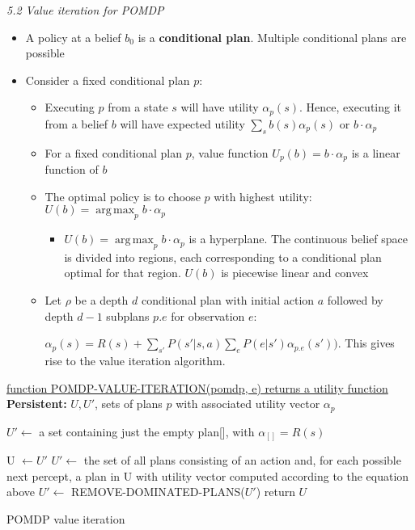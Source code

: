 \documentclass[12pt]{article}
\begin{document}
\noindent
\textsl{5.2 Value iteration for POMDP}

\begin{itemize}
\item A policy at a belief $b_0$ is a \textbf{conditional plan}. Multiple conditional plans are possible
\item Consider a fixed conditional plan $p$: 
\begin{itemize}
\item Executing $p$ from a state $s$ will have utility $\alpha_p(s)$. Hence, executing it from a belief $b$ will have expected utility $\sum_{s}^{} b(s) \alpha_p(s)$ or $b \cdot \alpha_p$
\item For a fixed conditional plan $p$, value function $U_p(b) = b \cdot \alpha_p$ is a linear function of $b$
\item The optimal policy is to choose $p$ with highest utility: $U(b) = \operatorname*{arg\,max}_{p} b \cdot \alpha_p$
\begin{itemize}
\item $U(b) = \operatorname*{arg\,max}_{p} b \cdot \alpha_p$ is a hyperplane. The continuous belief space is divided into regions, each corresponding to a conditional plan optimal for that region. $U(b)$ is piecewise linear and convex
\end{itemize}

\item Let $\rho$ be a depth $d$ conditional plan with initial action $a$ followed by depth $d-1$ subplans $p.e$ for observation $e$:

$\alpha_p(s) = R(s) + \sum_{s'}^{}P(s' | s, a) \sum_{e}^{}P(e | s')\alpha_{p.e}(s'))$. This gives rise to the value iteration algorithm.

\end{itemize}
\end{itemize}

\begin{algorithm}

    \underline{function POMDP-VALUE-ITERATION(pomdp, e) returns a utility function} \\
    \textbf{Persistent:} 
    {$U, U'$}, sets of plans $p$ with associated utility vector $\alpha_p$ \; 
     
     $U' \gets$ a set containing just the empty plan[], with $\alpha_{[]} = R(s)$
   
   {
      U $\gets U'$\;
      $U' \gets$ the set of all plans consisting of an action and, for each possible next percept, a plan in U with utility vector computed according to the equation above \;
      $U' \gets$ REMOVE-DOMINATED-PLANS($U'$) }
      return $U$
      \caption{POMDP value iteration}
\end{algorithm}
\end{document}
